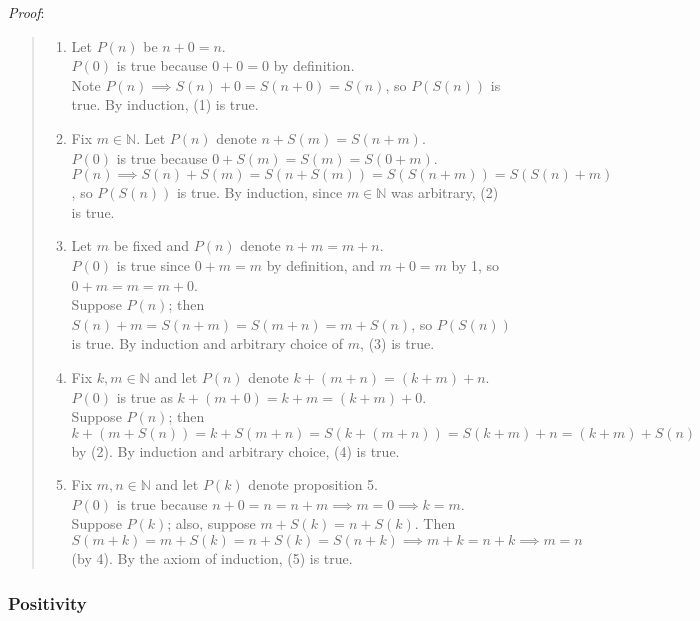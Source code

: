 \documentclass[11pt]{article}
\begin{document}
\emph{Proof}:
\begin{quote}\vspace{-0.3cm}
	\begin{enumerate}
	\item Let $P(n)$ be $n + 0 = n$.\\ $P(0)$ is true because $0 + 0 = 0$ by definition.\\
	Note $P(n) \implies S(n) + 0 = S(n + 0) = S(n)$, so $P(S(n))$ is true. By induction, (1) is true.

	\item Fix $m \in \mathbb{N}$. Let $P(n)$ denote $n + S(m) = S(n+m)$.\\
	$P(0)$ is true because $0 + S(m) = S(m) = S(0 + m)$.\\
	$P(n) \implies S(n) + S(m) = S(n + S(m)) = S(S(n+m)) = S(S(n) + m)$, so $P(S(n))$ is true. By induction, since $m \in \mathbb{N}$ was arbitrary, (2) is true.

	\item Let $m$ be fixed and $P(n)$ denote $n + m = m + n$.\\
	$P(0)$ is true since $0 + m = m$ by definition, and $m + 0 = m$ by 1, so $0 + m = m = m + 0$.\\
	Suppose $P(n)$; then $S(n) + m = S(n + m) = S(m + n) = m + S(n)$, so $P(S(n))$ is true. By induction and arbitrary choice of $m$, (3) is true.

	\item Fix $k,m \in \mathbb{N}$ and let $P(n)$ denote $k + (m + n) = (k + m) + n$.\\
	$P(0)$ is true as $k + (m + 0) = k + m = (k + m) + 0$.\\
	Suppose $P(n)$; then $k + (m + S(n)) = k + S(m + n) = S(k + (m + n)) = S(k + m) + n = (k + m) + S(n)$ by (2). By induction and arbitrary choice, (4) is true.

	\item Fix $m,n \in \mathbb{N}$ and let $P(k)$ denote proposition 5.\\
	$P(0)$ is true because $n + 0 = n = n + m \implies m = 0 \implies k = m$.\\
	Suppose $P(k)$; also, suppose $m + S(k) = n + S(k)$. Then $S(m+k) = m + S(k) = n + S(k) = S(n + k) \implies m + k = n + k \implies m = n$ (by 4). By the axiom of induction, (5) is true.
	\end{enumerate}
\end{quote}

\subsubsection{Positivity}
\end{document}
